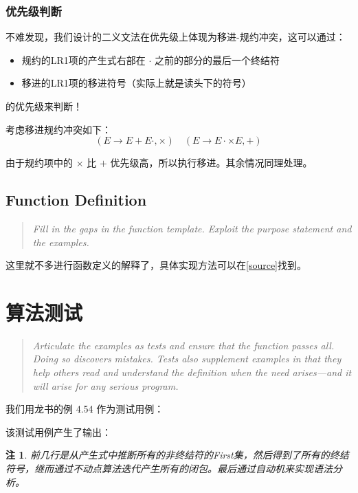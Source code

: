 \documentclass[lang=cn]{ctexart}
\newtheorem{remark}{注}
\begin{document}
{\subsubsection{优先级判断}

不难发现，我们设计的二义文法在优先级上体现为移进-规约冲突，这可以通过：
\begin{itemize}
	\item 规约的LR1项的产生式右部在 $\cdot$ 之前的部分的最后一个终结符
	\item 移进的LR1项的移进符号（实际上就是读头下的符号）
\end{itemize}
的优先级来判断！

考虑移进规约冲突如下：
$$
(E\rightarrow E+E\cdot, \times)\quad(E\rightarrow E \cdot \times E, +)
$$

由于规约项中的 $\times$ 比 $+$ 优先级高，所以执行移进。其余情况同理处理。

\subsection{Function Definition}
\begin{quotation}
\textit{Fill in the gaps in the function template. Exploit the purpose statement and the examples.}
\end{quotation}

这里就不多进行函数定义的解释了，具体实现方法可以在\ref{source}找到。

\section{算法测试}

\begin{quotation}
	\textit{Articulate the examples as tests and ensure that the function passes all. Doing so discovers mistakes. Tests also supplement examples in that they help others read and understand the definition when the need arises—and it will arise for any serious program.}
\end{quotation}

我们用龙书的例 4.54 作为测试用例：



该测试用例产生了输出：



\begin{remark}
	前几行是从产生式中推断所有的非终结符的First集，然后得到了所有的终结符号，继而通过不动点算法迭代产生所有的闭包。最后通过自动机来实现语法分析。
\end{remark}

}
\end{document}
